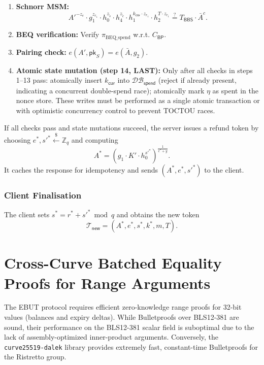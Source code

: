 \documentclass[11pt]{article}
\theoremstyle{definitionstyle}
\theoremstyle{plain}
\newcommand{\DB}{\mathcal{DB}}
\begin{document}
\begin{enumerate}[leftmargin=*]
\begin{align*}
    z_m \cdot h_4 + z_w \cdot h_0 - T_{\mathsf{BP}} &\stackrel{?}{=} z_{r_1} \cdot C_{\mathsf{BP}} - T_{\mathsf{scale},BP}.
  \end{align*}
\item \textbf{Schnorr MSM:}
  \[
  A'^{-z_e} \cdot g_1^{z_{r_1}} \cdot h_0^{z_{\tilde{s}}} \cdot h_4^{z_{\tilde{c}}} \cdot h_1^{k_{\mathsf{cur}} \cdot z_{r_1}} \cdot h_2^{T \cdot z_{r_1}} \stackrel{?}{=} T_{\mathsf{BBS}} \cdot \bar{A}^c.
  \]
\item \textbf{BEQ verification:} Verify $\pi_{\text{BEQ\_spend}}$ w.r.t. $C_{\mathsf{BP}}$.
\item \textbf{Pairing check:} $e(A', \mathsf{pk}_S) = e(\bar{A}, g_2)$.
\item \textbf{Atomic state mutation (step 14, LAST):} Only after all checks in steps 1--13 pass: atomically insert $k_{\mathsf{cur}}$ into $\DB_{\mathsf{spend}}$ (reject if already present, indicating a concurrent double-spend race); atomically mark $\eta$ as spent in the nonce store. These writes must be performed as a single atomic transaction or with optimistic concurrency control to prevent TOCTOU races.
\end{enumerate}

If all checks pass and state mutations succeed, the server issues a refund token by choosing $e^*, s'^* \xleftarrow{\$} \mathbb{Z}_q$ and computing
\[
A^* = \left( g_1 \cdot K' \cdot h_0^{s'^*} \right)^{\frac{1}{e^* + y}}.
\]
It caches the response for idempotency and sends $(A^*, e^*, s'^*)$ to the client.

\subsubsection{Client Finalisation}
The client sets $s^* = r^* + s'^* \bmod q$ and obtains the new token
\[
\mathcal{T}_{\mathsf{new}} = (A^*, e^*, s^*, k^*, m, T).
\]

\section{Cross-Curve Batched Equality Proofs for Range Arguments}
\label{sec:crosscurve}

The EBUT protocol requires efficient zero-knowledge range proofs for 32-bit values (balances and expiry deltas). While Bulletproofs over BLS12-381 are sound, their performance on the BLS12-381 scalar field is suboptimal due to the lack of assembly-optimized inner-product arguments. Conversely, the \texttt{curve25519-dalek} library provides extremely fast, constant-time Bulletproofs for the Ristretto group.
\end{document}
